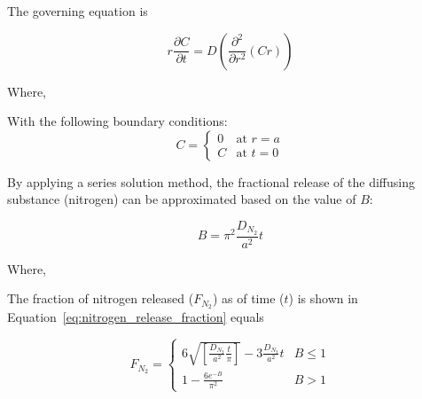 The governing equation is

\begin{equation}
    \label{eq:nitrogen_release}
    r\frac{\partial C}{\partial t} = D\left( \frac{\partial^{2}}{\partial r^{2}}\left( C r \right) \right)
\end{equation}

Where,

With the following boundary conditions:
\begin{equation}
    \label{eq:nitrogen_release_bcs}
    C = \begin{cases}
        0  & \text{at $r = a$} \\
        C  & \text{at $t = 0$}
    \end{cases}
\end{equation}

By applying a series solution method, the fractional release of the diffusing substance (nitrogen)
can be approximated based on the value of
\(B\):

\begin{equation}
    \label{eq:nitrogen_release_b}
    B = \pi^{2}\frac{D_{N_{2}}}{a^{2}}t
\end{equation}

Where,

The fraction of nitrogen released (\(F_{N_{2}}\)) as of time (\(t\)) is shown in
Equation~\ref{eq:nitrogen_release_fraction} equals

\begin{equation}
    \label{eq:nitrogen_release_fraction}
    F_{N_{2}} = \begin{cases}
                6\sqrt{\left[ \frac{D_{N_{2}}}{a^{2}}\frac{t}{\pi} \right]} - 3\frac{D_{N_{2}}}{a^{2}}t & B \leq 1  \\
                1 - \frac{6e^{- B}}{\pi^{2}}                                                            & B > 1
    \end{cases}
\end{equation}

